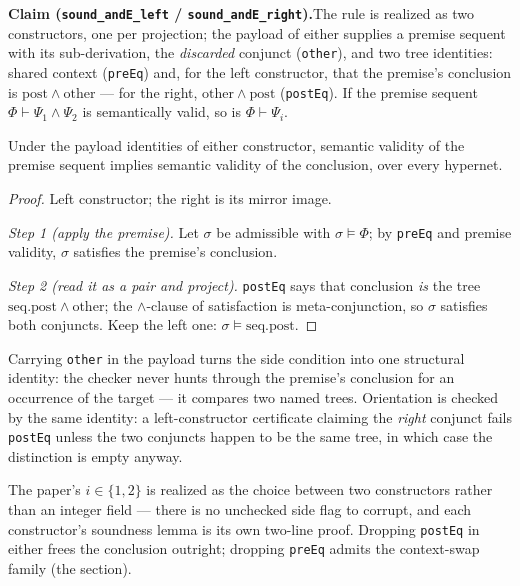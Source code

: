 

\textbf{Claim (\texttt{sound\_andE\_left} /
\texttt{sound\_andE\_right}).}\enspace The rule is realized as two
constructors, one per projection; the payload of either supplies a
premise sequent with its sub-derivation, the \emph{discarded} conjunct
(\texttt{other}), and two tree identities: shared context
(\texttt{preEq}) and, for the left constructor, that the premise's
conclusion is $\mathrm{post} \wedge \mathrm{other}$ --- for the right,
$\mathrm{other} \wedge \mathrm{post}$ (\texttt{postEq}). If the premise
sequent $\Phi \vdash \Psi_1 \wedge \Psi_2$ is semantically valid, so is
$\Phi \vdash \Psi_i$.

\begin{bthm}\label{thm:ande-sound}
Under the payload identities of either constructor, semantic validity of
the premise sequent implies semantic validity of the conclusion, over
every hypernet.
\end{bthm}
\begin{proof}
Left constructor; the right is its mirror image.

\emph{Step 1 (apply the premise).} Let $\sigma$ be admissible with
$\sigma \models \Phi$; by \texttt{preEq} and premise validity,
$\sigma$ satisfies the premise's conclusion.

\emph{Step 2 (read it as a pair and project).} \texttt{postEq} says that
conclusion \emph{is} the tree
$\mathrm{seq.post} \wedge \mathrm{other}$; the $\wedge$-clause of
satisfaction is meta-conjunction, so $\sigma$ satisfies both conjuncts.
Keep the left one: $\sigma \models \mathrm{seq.post}$.
\end{proof}

\begin{bremark}
\label{rem:ande-other}
Carrying \texttt{other} in the payload turns the side condition into one
structural identity: the checker never hunts through the premise's
conclusion for an occurrence of the target --- it compares two named
trees. Orientation is checked by the same identity: a left-constructor
certificate claiming the \emph{right} conjunct fails \texttt{postEq}
unless the two conjuncts happen to be the same tree, in which case the
distinction is empty anyway.
\end{bremark}

\begin{bremark}
The paper's $i \in \{1, 2\}$ is realized as the choice between two
constructors rather than an integer field --- there is no unchecked
side flag to corrupt, and each constructor's soundness lemma is its own
two-line proof. Dropping \texttt{postEq} in either frees the conclusion
outright; dropping \texttt{preEq} admits the context-swap family (the
 section).
\end{bremark}

